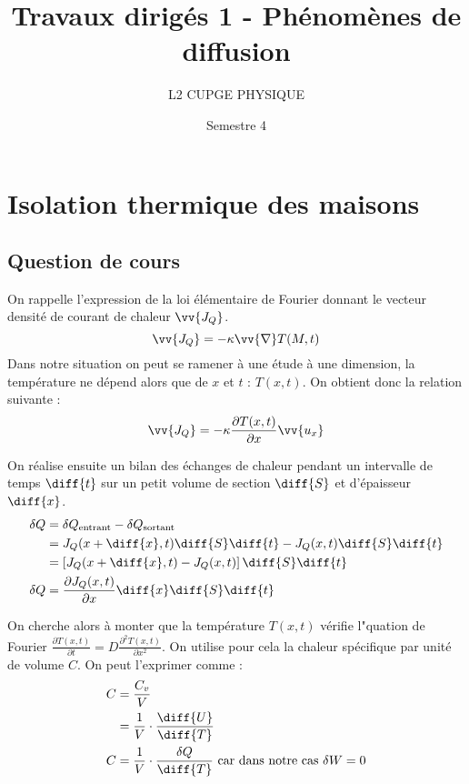 \documentclass[a4paper,12pt]{article}
\title{Travaux dirigés 1 - Phénomènes de diffusion}
\author{L2 CUPGE PHYSIQUE}
\date{Semestre 4}
\begin{document}
\maketitle

\section{Isolation thermique des maisons}

\subsection{Question de cours}

On rappelle l'expression de la loi élémentaire de Fourier donnant le vecteur densité de courant de chaleur $\vv{J_Q}$.
\begin{equation}
	\vv{J_Q} = - \kappa \vv{\nabla} T(M,t)
\end{equation}
Dans notre situation on peut se ramener à une étude à une dimension, la température ne dépend alors que de $x$ et $t$ : $T(x,t)$. On obtient donc la relation suivante :
\begin{equation}
	\vv{J_Q} = - \kappa \frac{\partial T(x,t)}{\partial x} \vv{u_x}
\end{equation}

On réalise ensuite un bilan des échanges de chaleur pendant un intervalle de temps $\diff{t}$ sur un petit volume de section $\diff{S}$ et d'épaisseur $\diff{x}$.
\begin{equation}
	\begin{split}
		\delta Q &= \delta Q_\text{entrant} - \delta Q_\text{sortant}\\
		&= J_Q ( x+\diff{x},t ) \diff{S}\diff{t} - J_Q (x,t) \diff{S}\diff{t}\\
		&= \left[ J_Q (x+\diff{x},t) - J_Q (x,t) \right] \diff{S}\diff{t}\\
		\delta Q &= \frac{\partial J_Q (x,t)}{\partial x} \diff{x} \diff{S} \diff{t}
	\end{split}
\end{equation}

On cherche alors à monter que la température $T(x,t)$ vérifie l"quation de Fourier $\frac{\partial T(x,t)}{\partial t} = D \frac{\partial^2 T(x,t)}{\partial x^2}$. On utilise pour cela la chaleur spécifique par unité de volume $C$. On peut l'exprimer comme :
\begin{equation}
	\begin{split}
		C &= \frac{C_v}{V}\\
		  &= \frac{1}{V} \cdot \frac{\diff{U}}{\diff{T}}\\
		C &= \frac{1}{V} \cdot \frac{\delta Q}{\diff{T}} \text{ car dans notre cas } \delta W = 0
	\end{split}
\end{equation}
\end{document}
